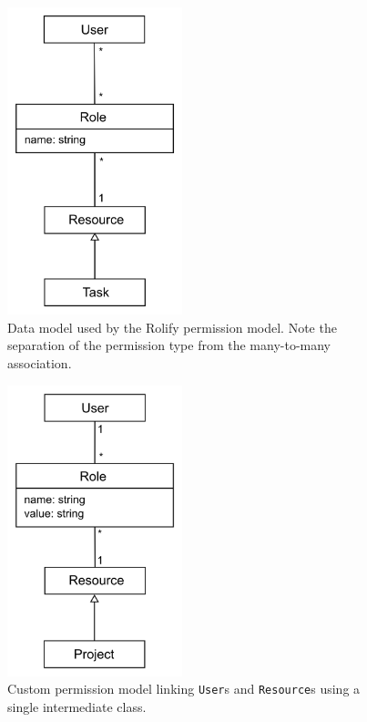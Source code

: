 \documentclass[document.tex]{subfiles}
\begin{document}
\begin{figure}[!ht]
\centering \includegraphics[width=2.0in]{./img/case-study-research-railgun/rolify-data-model}
\caption{Data model used by the Rolify permission model. Note the separation of the permission type from the many-to-many association.}
\label{fig:case-research-rolify-data-model}
\end{figure}

\begin{figure}[!ht]
\centering
\includegraphics[width=2.0in]{./img/case-study-research-railgun/permission-data-model}
\cprotect\caption{Custom permission model linking \verb!User!s and \verb!Resource!s using a single intermediate class.}
\label{fig:case-research-sane-permission-data-model}
\end{figure}
\end{document}
